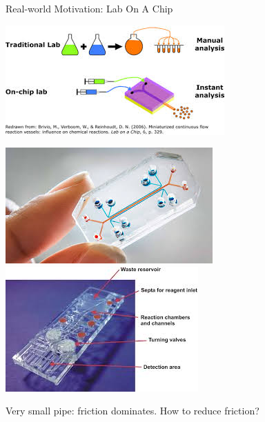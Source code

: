 \documentclass{beamer}
\begin{document}
\begin{frame}{Real-world Motivation: Lab On A Chip}

\begin{center}
\includegraphics[scale=0.5]{lab-schematic.jpg}
\end{center}
\begin{center}
\includegraphics[scale=0.48]{lab-on-chip.jpg}
\phantom{gap}
\includegraphics[scale=0.5]{lab-on-chip-2.jpg}
\end{center}

Very small pipe: friction dominates.
\hspace{2em}
How to reduce friction?
\end{frame}
\end{document}
